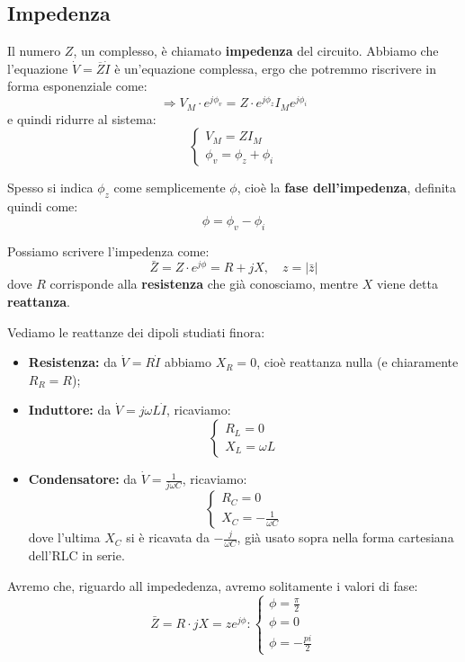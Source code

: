 \documentclass[a4paper,11pt]{article}
\begin{document}
\subsection{Impedenza}
Il numero $Z$, un complesso, è chiamato \textbf{impedenza} del circuito.
Abbiamo che l'equazione $\dot{V} = \overline{Z} \dot{I}$ è un'equazione complessa, ergo che potremmo riscrivere in forma esponenziale come:
$$
\Rightarrow V_M \cdot e^{j \phi_v} = Z \cdot e^{j \phi_z} I_M e^{j \phi_i}
$$
e quindi ridurre al sistema:
\[
	\begin{cases}
		V_M = Z I_M \\ 
		\phi_v = \phi_z + \phi_i
	\end{cases}
\]

Spesso si indica $\phi_z$ come semplicemente $\phi$, cioè la \textbf{fase dell'impedenza}, definita quindi come:
$$
\phi = \phi_v - \phi_i
$$

Possiamo scrivere l'impedenza come:
$$
\bar{Z} = Z \cdot e^{j \phi} = R + j X, \quad z = |\bar{z}|
$$
dove $R$ corrisponde alla \textbf{resistenza} che già conosciamo, mentre $X$ viene detta \textbf{reattanza}.

Vediamo le reattanze dei dipoli studiati finora:
\begin{itemize}
	\item \textbf{Resistenza:} da $\dot{V} = R \dot{I}$ abbiamo $X_R = 0$, cioè reattanza nulla (e chiaramente $R_R = R$);
	\item \textbf{Induttore:} da $\dot{V} = j \omega L \dot{I}$, ricaviamo:
		\[
			\begin{cases}
				R_L = 0	\\ 
				X_L = \omega L
			\end{cases}
		\]
	\item \textbf{Condensatore:} da $\dot{V} = \frac{1}{j \omega C}$, ricaviamo:
		\[
			\begin{cases}
				R_C = 0	\\ 
				X_C = -\frac{1}{\omega C}
			\end{cases}
		\]
		dove l'ultima $X_C$ si è ricavata da $-\frac{j}{\omega C}$, già usato sopra nella forma cartesiana dell'RLC in serie.
\end{itemize}

Avremo che, riguardo all impededenza, avremo solitamente i valori di fase:
$$
\bar{Z} = R \cdot j X = z e^{j \phi}:
	\begin{cases}
		\phi = \frac{\pi}{2} \\ 
		\phi = 0 \\ 
		\phi = -\frac{pi}{2}
	\end{cases}
$$
\end{document}
